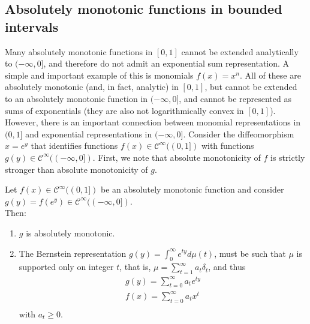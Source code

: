 \documentclass[12pt,a4paper]{article}
\newcommand{\cinfty} {\mathcal{C}^{\infty}}
\begin{document}
\subsection{Absolutely monotonic functions in bounded intervals}

Many absolutely monotonic functions in $[0,1]$ cannot be extended analytically to $(-\infty,0]$, and therefore do not admit an exponential sum representation. A simple and important example of this is monomials $f(x) = x^n$. All of these are absolutely monotonic (and, in fact, analytic) in $[0,1]$, but cannot be extended to an absolutely monotonic function in $(-\infty,0]$, and cannot be represented as sums of exponentials (they are also not logarithmically convex in $[0,1]$).\\

However, there is an important connection between monomial representations in $(0,1]$ and exponential representations in $(-\infty,0]$. Consider the diffeomorphism $x = e^y$ that identifies functions $f(x) \in \cinfty((0,1])$ with functions $g(y) \in \cinfty((-\infty,0])$. First, we note that absolute monotonicity of $f$ is strictly stronger than absolute monotonicity of $g$.

\begin{lemma}
Let $f(x) \in \cinfty((0,1])$ be an absolutely monotonic function and consider $g(y) = f(e^y) \in \cinfty((-\infty,0])$.\\

Then:
\begin{enumerate}
\item $g$ is absolutely monotonic.
\item The Bernstein representation $g(y) = \int_0^{\infty} e^{ty}d\mu(t)$, must be such that $\mu$ is supported only on integer $t$, that is, $\mu = \sum_{t=1}^{\infty} a_t \delta_t$, and thus
\begin{equation}
\begin{array}{l}
g(y) = \sum_{t=0}^{\infty} a_t e^{ty}\\
f(x) = \sum_{t=0}^{\infty} a_t x^t\\
\end{array}
\end{equation}
\noindent with $a_t \geq 0$.
\end{enumerate}
\end{lemma}
\end{document}
